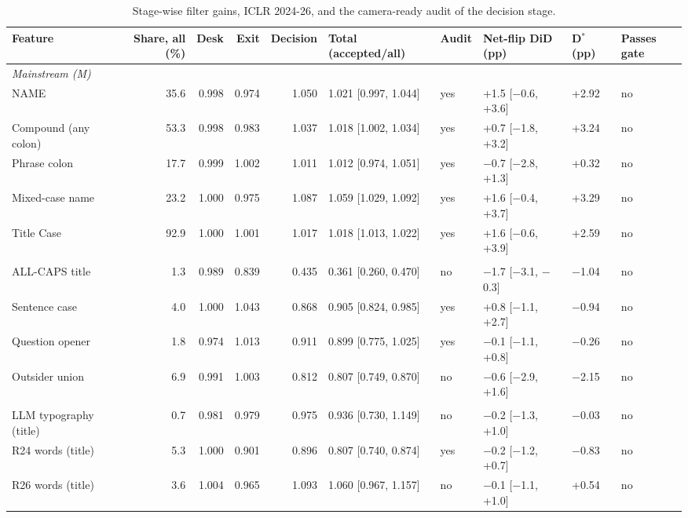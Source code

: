 \begin{table}[t]
\centering
\scriptsize
\caption{Stage-wise filter gains, ICLR 2024-26, and the camera-ready audit of the decision stage.}
\label{tab:filter}
\begin{tabular}{l r r r r l l l l l}
\toprule
Feature & Share, all (\%) & Desk & Exit & Decision & Total (accepted/all) & Audit & Net-flip DiD (pp) & D$^{*}$ (pp) & Passes gate \\
\midrule
\multicolumn{10}{l}{\textit{Mainstream (M)}} \\
NAME & 35.6 & 0.998 & 0.974 & 1.050 & 1.021 [0.997, 1.044] & yes & +1.5 [$-$0.6, +3.6] & +2.92 & no \\
Compound (any colon) & 53.3 & 0.998 & 0.983 & 1.037 & 1.018 [1.002, 1.034] & yes & +0.7 [$-$1.8, +3.2] & +3.24 & no \\
Phrase colon & 17.7 & 0.999 & 1.002 & 1.011 & 1.012 [0.974, 1.051] & yes & $-$0.7 [$-$2.8, +1.3] & +0.32 & no \\
Mixed-case name & 23.2 & 1.000 & 0.975 & 1.087 & 1.059 [1.029, 1.092] & yes & +1.6 [$-$0.4, +3.7] & +3.29 & no \\
Title Case & 92.9 & 1.000 & 1.001 & 1.017 & 1.018 [1.013, 1.022] & yes & +1.6 [$-$0.6, +3.9] & +2.59 & no \\
\addlinespace
\multicolumn{10}{l}{\textit{Outsider (O)}} \\
ALL-CAPS title & 1.3 & 0.989 & 0.839 & 0.435 & 0.361 [0.260, 0.470] & no & $-$1.7 [$-$3.1, $-$0.3] & $-$1.04 & no \\
Sentence case & 4.0 & 1.000 & 1.043 & 0.868 & 0.905 [0.824, 0.985] & yes & +0.8 [$-$1.1, +2.7] & $-$0.94 & no \\
Question opener & 1.8 & 0.974 & 1.013 & 0.911 & 0.899 [0.775, 1.025] & yes & $-$0.1 [$-$1.1, +0.8] & $-$0.26 & no \\
Outsider union & 6.9 & 0.991 & 1.003 & 0.812 & 0.807 [0.749, 0.870] & no & $-$0.6 [$-$2.9, +1.6] & $-$2.15 & no \\
\addlinespace
\multicolumn{10}{l}{\textit{LLM-style (L)}} \\
LLM typography (title) & 0.7 & 0.981 & 0.979 & 0.975 & 0.936 [0.730, 1.149] & no & $-$0.2 [$-$1.3, +1.0] & $-$0.03 & no \\
R24 words (title) & 5.3 & 1.000 & 0.901 & 0.896 & 0.807 [0.740, 0.874] & yes & $-$0.2 [$-$1.2, +0.7] & $-$0.83 & no \\
R26 words (title) & 3.6 & 1.004 & 0.965 & 1.093 & 1.060 [0.967, 1.157] & no & $-$0.1 [$-$1.1, +1.0] & +0.54 & no \\

\end{tabular}
\end{table}
